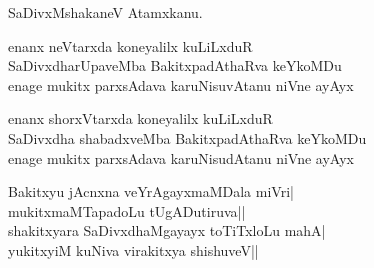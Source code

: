\begin{entry}
\begin{shl}
SaDivxMshakaneV Atamxkanu.
\end{shl}
\end{entry}

\begin{entry}
\begin{shl}
enanx neVtarxda koneyalilx kuLiLxduR\\
SaDivxdharUpaveMba BakitxpadAthaRva keYkoMDu\\
enage mukitx parxsAdava karuNisuvAtanu niVne ayAyx
\end{shl}
\end{entry}

\begin{entry}
\begin{shl}
enanx shorxVtarxda koneyalilx kuLiLxduR\\
SaDivxdha shabadxveMba BakitxpadAthaRva keYkoMDu\\
enage mukitx parxsAdava karuNisudAtanu niVne ayAyx
\end{shl}
\end{entry}

\begin{entry}
\begin{shl}
Bakitxyu jAcnxna veYrAgayxmaMDala miVri|\\
mukitxmaMTapadoLu tUgADutiruva||\\
shakitxyara SaDivxdhaMgayayx toTiTxloLu mahA|\\
yukitxyiM kuNiva virakitxya shishuveV||
\end{shl}
\end{entry}

